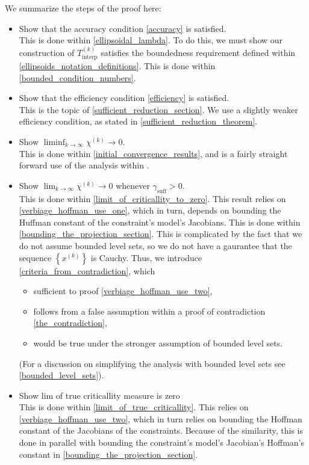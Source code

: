 \documentclass{article}
\theoremstyle{case}
\numberwithin{theorem}{subsection}
\newcommand{\chik}{{\chi^{(k)}}}
\newcommand{\gammabi}{\gamma_{\textrm{suff}}}
\newcommand{\sampletrk}{{T_{\text{interp}}^{(k)}}}
\newcommand{\xk}{x^{(k)}}
\begin{document}
We summarize the steps of the proof here:
\begin{itemize}
\item Show that the accuracy condition \cref{accuracy} is satisfied. \\
This is done within \cref{ellipsoidal_lambda}. 
To do this, we must show our construction of $\sampletrk$ satisfies the boundedness requirement defined within \cref{ellipsoids_notation_definitions}.
This is done within \cref{bounded_condition_numbers}.
\item Show that the efficiency condition \cref{efficiency} is satisfied. \\
This is the topic of \cref{sufficient_reduction_section}.
We use a slightly weaker efficiency condition, as stated in \cref{sufficient_reduction_theorem}.
\item Show $\liminf_{k\to\infty} \chik \to 0$. \\
This is done within \cref{initial_convergence_results}, and is a fairly straight forward use of the analysis within \cite{Conejo:2013:GCT:2620806.2621814}.
\item Show $\lim_{k\to\infty} \chik \to 0$ whenever $\gammabi > 0$. \\
This is done within \cref{limit_of_criticallity_to_zero}.
This result relies on \cref{verbiage_hoffman_use_one}, which in turn, depends on bounding the Huffman constant of the constraint's model's Jacobians.
This is done within \cref{bounding_the_projection_section}.
This is complicated by the fact that we do not assume bounded level sets, so we do not have a gaurantee that the sequence $\left\{\xk\right\}$ is Cauchy.
Thus, we introduce \cref{criteria_from_contradiction}, which
\begin{itemize}
\item sufficient to proof \cref{verbiage_hoffman_use_two},
\item follows from a false assumption within a proof of contradiction \cref{the_contradiction},
\item would be true under the stronger assumption of bounded level sets.
\end{itemize}
(For a discussion on simplifying the analysis with bounded level sets see \cref{bounded_level_sets}).
\item Show lim of true criticallity measure is zero \\
This is done within \cref{limit_of_true_criticallity}.
This relies on \cref{verbiage_hoffman_use_two}, which in turn relies on bounding the Hoffman constant of the Jacobians of the constraints.
Because of the similarity, this is done in parallel with bounding the constraint's model's Jacobian's Hoffman's constant in \cref{bounding_the_projection_section}.
\end{itemize}
\end{document}
